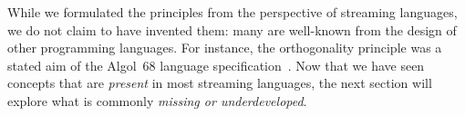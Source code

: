 While
we formulated the principles from the perspective of streaming
languages, we do not claim to have invented them: many are well-known
from the design of other programming languages. For instance, the
orthogonality principle was a stated aim of the Algol~68 language
specification~\cite{vanwijngaarden_et_al_1975}. Now that we have seen
concepts that are \emph{present} in most streaming languages, the next
section will explore what is commonly \emph{missing or
  underdeveloped}.
